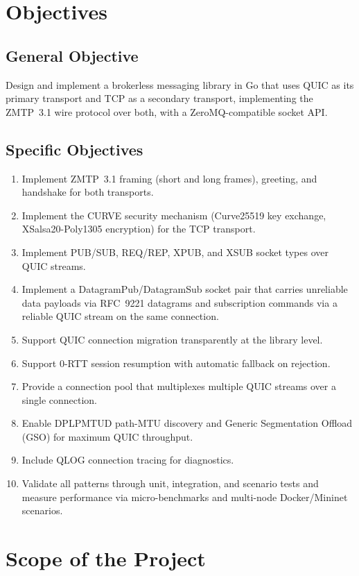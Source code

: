 \documentclass[12pt, a4paper, oneside]{report}
\begin{document}
\section{Objectives}
\label{sec:objectives}

\subsection{General Objective}
Design and implement a brokerless messaging library in Go that uses QUIC as its primary transport and TCP as a secondary transport, implementing the ZMTP~3.1 wire protocol over both, with a ZeroMQ-compatible socket API.

\subsection{Specific Objectives}
\begin{enumerate}
  \item Implement ZMTP~3.1 framing (short and long frames), greeting, and handshake for both transports.
  \item Implement the CURVE security mechanism (Curve25519 key exchange, XSalsa20-Poly1305 encryption) for the TCP transport.
  \item Implement PUB/SUB, REQ/REP, XPUB, and XSUB socket types over QUIC streams.
  \item Implement a DatagramPub/DatagramSub socket pair that carries unreliable data payloads via RFC~9221 datagrams and subscription commands via a reliable QUIC stream on the same connection.
  \item Support QUIC connection migration transparently at the library level.
  \item Support 0-RTT session resumption with automatic fallback on rejection.
  \item Provide a connection pool that multiplexes multiple QUIC streams over a single connection.
  \item Enable DPLPMTUD path-MTU discovery and Generic Segmentation Offload (GSO) for maximum QUIC throughput.
  \item Include QLOG connection tracing for diagnostics.
  \item Validate all patterns through unit, integration, and scenario tests and measure performance via micro-benchmarks and multi-node Docker/Mininet scenarios.
\end{enumerate}

\section{Scope of the Project}
\label{sec:scope}
\end{document}
